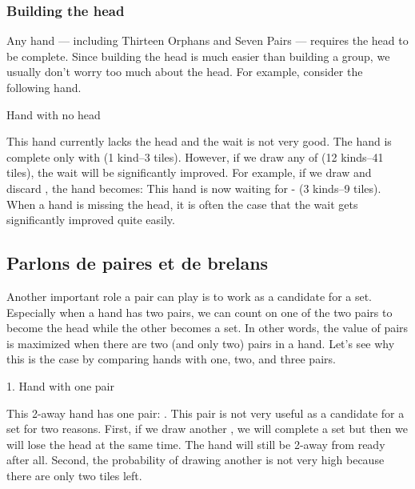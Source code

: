 \subsubsection{Building the head}
Any hand --- including Thirteen Orphans and Seven Pairs --- requires the head to be complete. Since building the head is much easier than building a group, we usually don't worry too much about the head. For example, consider the following hand. 
\bigskip
\begin{itembox}[r]{Hand with no head}
\bp
{}
\ep
\end{itembox}
This hand currently lacks the head and the wait is not very good. The hand is complete only with {\LARGE{}} (1 kind--3 tiles).
However, if we draw any of {\LARGE{}} (12 kinds--41 tiles), the wait will be significantly improved. 
For example, if we draw {\LARGE{}} and discard {\LARGE{}}, the hand becomes:
\bp
{}
\ep
This hand is now waiting for {\LARGE{} -} (3 kinds--9 tiles). 
When a hand is missing the head, it is often the case that the wait gets significantly improved quite easily. 

\subsection{Parlons de paires et de brelans} \label{sec:2pairs}
Another important role a pair can play is to work as a candidate for a set. 
Especially when a hand has two pairs, we can count on one of the two pairs to become the head while the other becomes a set. In other words, the value of pairs is maximized when there are two (and only two) pairs in a hand. Let's see why this is the case by comparing hands with one, two, and three pairs. 

\begin{itembox}[r]{1. Hand with one pair}
\bp
{}\bei
\ep
\end{itembox}
\noindent
This 2-away hand has one pair: {\LARGE{}}. This pair is not very useful as a candidate for a set for two reasons. First, if we draw another {\LARGE{}}, we will complete a set but then we will lose the head at the same time. The hand will still be 2-away from ready after all. Second, the probability of drawing another {\LARGE{}} is not very high because there are only two tiles left. 

